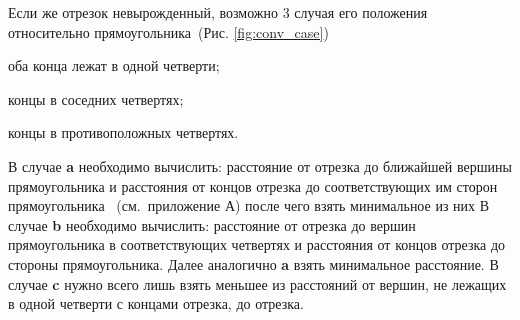 Если же отрезок невырожденный, возможно 3 случая его положения относительно прямоугольника~(Рис. \ref{fig:conv_case})
\begin{list}{a}{}
\item[\textbf{a})] оба конца лежат в одной четверти;
\item[\textbf{b})] концы в соседних четвертях;
\item[\textbf{c})] концы в противоположных четвертях.
\end{list}
В случае \textbf{a} необходимо вычислить: расстояние от отрезка до ближайшей вершины прямоугольника и расстояния от концов отрезка до соответствующих им сторон прямоугольника~
(см.~приложение А) после чего взять минимальное из них
В случае \textbf{b} необходимо вычислить: расстояние от отрезка до вершин прямоугольника в соответствующих четвертях и расстояния от концов отрезка до стороны прямоугольника. Далее аналогично \textbf{a} взять минимальное расстояние.
В случае \textbf{c} нужно всего лишь взять меньшее из расстояний от вершин, не лежащих в одной четверти с концами отрезка, до отрезка.
